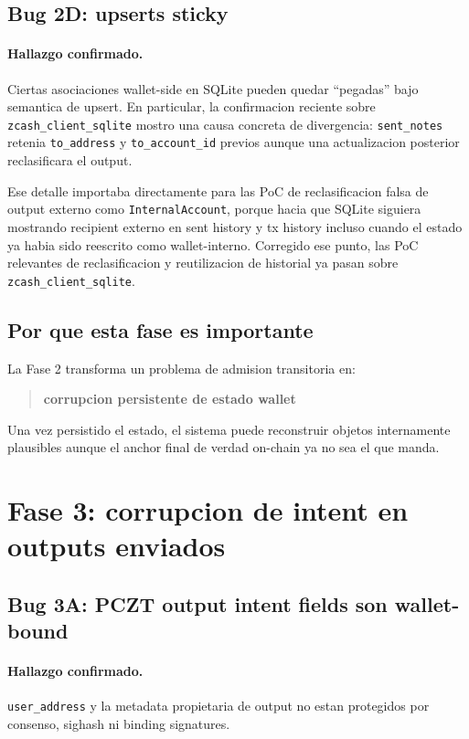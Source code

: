 \documentclass[11pt,a4paper]{article}
\begin{document}
\subsection{Bug 2D: upserts sticky}

\paragraph{Hallazgo confirmado.}
Ciertas asociaciones wallet-side en SQLite pueden quedar ``pegadas'' bajo
semantica de upsert. En particular, la confirmacion reciente sobre
\texttt{zcash\_client\_sqlite} mostro una causa concreta de divergencia:
\texttt{sent\_notes} retenia \texttt{to\_address} y \texttt{to\_account\_id}
previos aunque una actualizacion posterior reclasificara el output.

Ese detalle importaba directamente para las PoC de reclasificacion falsa de
output externo como \texttt{InternalAccount}, porque hacia que SQLite siguiera
mostrando recipient externo en sent history y tx history incluso cuando el
estado ya habia sido reescrito como wallet-interno. Corregido ese punto, las
PoC relevantes de reclasificacion y reutilizacion de historial ya pasan sobre
\texttt{zcash\_client\_sqlite}.

\subsection{Por que esta fase es importante}

La Fase 2 transforma un problema de admision transitoria en:

\begin{quote}
\textbf{corrupcion persistente de estado wallet}
\end{quote}

Una vez persistido el estado, el sistema puede reconstruir objetos
internamente plausibles aunque el anchor final de verdad on-chain ya no sea el
que manda.

\section{Fase 3: corrupcion de intent en outputs enviados}

\subsection{Bug 3A: PCZT output intent fields son wallet-bound}

\paragraph{Hallazgo confirmado.}
\texttt{user\_address} y la metadata propietaria de output no estan protegidos
por consenso, sighash ni binding signatures.
\end{document}
